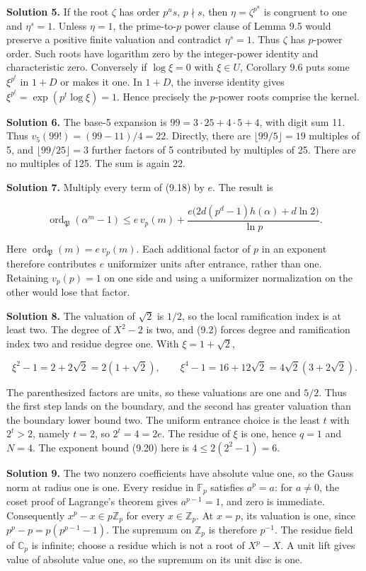 \documentclass[
  11pt,
  a4paper,
]{article}
\begin{document}
\textbf{Solution 5.} If the root \(\zeta\) has order \(p^u s\),
\(p\nmid s\), then \(\eta=\zeta^{p^u}\) is congruent to one and
\(\eta^s=1\). Unless \(\eta=1\), the prime-to-\(p\) power clause of
Lemma 9.5 would preserve a positive finite valuation and contradict
\(\eta^s=1\). Thus \(\zeta\) has \(p\)-power order. Such roots have
logarithm zero by the integer-power identity and characteristic zero.
Conversely if \(\log\xi=0\) with \(\xi\in U\), Corollary 9.6 puts some
\(\xi^{p^t}\) in \(1+D\) or makes it one. In \(1+D\), the inverse
identity gives \(\xi^{p^t}=\exp(p^t\log\xi)=1\). Hence precisely the
\(p\)-power roots comprise the kernel.

\textbf{Solution 6.} The base-5 expansion is \(99=3\cdot25+4\cdot5+4\),
with digit sum 11. Thus \(v_5(99!)=(99-11)/4=22\). Directly, there are
\(\lfloor99/5\rfloor=19\) multiples of 5, and \(\lfloor99/25\rfloor=3\)
further factors of 5 contributed by multiples of 25. There are no
multiples of 125. The sum is again 22.

\textbf{Solution 7.} Multiply every term of (9.18) by \(e\). The result
is

\[
\operatorname{ord}_{\mathfrak P}(\alpha^m-1)
\le e\,v_p(m)+\frac{e\bigl(2d(p^d-1)h(\alpha)+d\ln2\bigr)}{\ln p}.
\]

Here \(\operatorname{ord}_{\mathfrak P}(m)=e\,v_p(m)\). Each additional
factor of \(p\) in an exponent therefore contributes \(e\) uniformizer
units after entrance, rather than one. Retaining \(v_p(p)=1\) on one
side and using a uniformizer normalization on the other would lose that
factor.

\textbf{Solution 8.} The valuation of \(\sqrt2\) is \(1/2\), so the
local ramification index is at least two. The degree of \(X^2-2\) is
two, and (9.2) forces degree and ramification index two and residue
degree one. With \(\xi=1+\sqrt2\),

\[
\xi^2-1=2+2\sqrt2=2(1+\sqrt2),
\qquad
\xi^4-1=16+12\sqrt2=4\sqrt2(3+2\sqrt2).
\]

The parenthesized factors are units, so these valuations are one and
\(5/2\). Thus the first step lands on the boundary, and the second has
greater valuation than the boundary lower bound two. The uniform
entrance choice is the least \(t\) with \(2^t>2\), namely \(t=2\), so
\(2^t=4=2e\). The residue of \(\xi\) is one, hence \(q=1\) and \(N=4\).
The exponent bound (9.20) here is \(4\le2(2^2-1)=6\).

\textbf{Solution 9.} The two nonzero coefficients have absolute value
one, so the Gauss norm at radius one is one. Every residue in
\(\mathbb F_p\) satisfies \(a^p=a\): for \(a\ne0\), the coset proof of
Lagrange's theorem gives \(a^{p-1}=1\), and zero is immediate.
Consequently \(x^p-x\in p\mathbb Z_p\) for every \(x\in\mathbb Z_p\). At
\(x=p\), its valuation is one, since \(p^p-p=p(p^{p-1}-1)\). The
supremum on \(\mathbb Z_p\) is therefore \(p^{-1}\). The residue field
of \(\mathbb C_p\) is infinite; choose a residue which is not a root of
\(X^p-X\). A unit lift gives value of absolute value one, so the
supremum on its unit disc is one.
\end{document}
